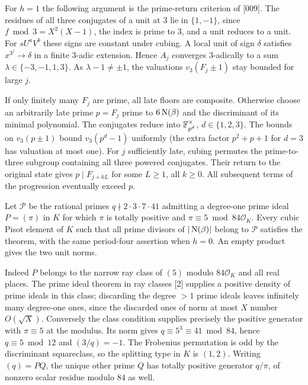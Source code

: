 \documentclass[11pt,a4paper,oneside,openany]{book}
\begin{document}
For $h=1$ the following argument is the prime-return criterion of [009]. The residues of all three conjugates of a unit at $3$ lie in $\{1,-1\}$, since $f\bmod3=X^2(X-1)$, the index is prime to $3$, and a unit reduces to a unit. For $sU^aV^b$ these signs are constant under cubing. A local unit of sign $\delta$ satisfies $x^{3^j}\to\delta$ in a finite $3$-adic extension. Hence $A_j$ converges $3$-adically to a sum $\lambda\in\{-3,-1,1,3\}$. As $\lambda-1\ne\pm1$, the valuations $v_3(F_j\pm1)$ stay bounded for large $j$.

If only finitely many $F_j$ are prime, all late floors are composite. Otherwise choose an arbitrarily late prime $p=F_j$ prime to $6\operatorname{N}(\beta)$ and the discriminant of its minimal polynomial. The conjugates reduce into $\mathbb F_{p^d}^\times$, $d\in\{1,2,3\}$. The bounds on $v_3(p\pm1)$ bound $v_3(p^d-1)$ uniformly (the extra factor $p^2+p+1$ for $d=3$ has valuation at most one). For $j$ sufficiently late, cubing permutes the prime-to-three subgroup containing all three powered conjugates. Their return to the original state gives $p\mid F_{j+kL}$ for some $L\ge1$, all $k\ge0$. All subsequent terms of the progression eventually exceed $p$.



Let $\mathcal P$ be the rational primes $q\nmid 2\cdot3\cdot7\cdot41$ admitting a degree-one prime ideal $P=(\pi)$ in $K$ for which $\pi$ is totally positive and $\pi\equiv5\bmod84\mathcal O_K$. Every cubic Pisot element of $K$ such that all prime divisors of $|\operatorname{N}(\beta)|$ belong to $\mathcal P$ satisfies the theorem, with the same period-four assertion when $h=0$. An empty product gives the two unit norms.

Indeed $P$ belongs to the narrow ray class of $(5)$ modulo $84\mathcal O_K$ and all real places. The prime ideal theorem in ray classes [2] supplies a positive density of prime ideals in this class; discarding the degree $>1$ prime ideals leaves infinitely many degree-one ones, since the discarded ones of norm at most $X$ number $O(\sqrt X)$. Conversely the class condition supplies precisely the positive generator with $\pi\equiv5$ at the modulus. Its norm gives $q\equiv5^3\equiv41\bmod84$, hence $q\equiv5\bmod12$ and $(3/q)=-1$. The Frobenius permutation is odd by the discriminant squareclass, so the splitting type in $K$ is $(1,2)$. Writing $(q)=PQ$, the unique other prime $Q$ has totally positive generator $q/\pi$, of nonzero scalar residue modulo $84$ as well.
\end{document}
